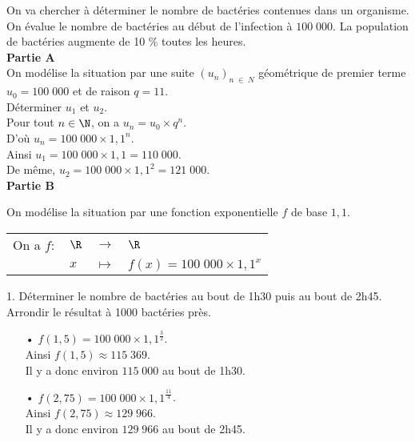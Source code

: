 On va chercher à déterminer le nombre de bactéries contenues dans un organisme. \\
On évalue le nombre de bactéries au début de l'infection à $100\;000$. La population de bactéries augmente de 10 \% toutes les heures. \\

\textbf{Partie A} \\

On modélise la situation par une suite $\left(u_n\right)_{n \; \in \; N}$ géométrique de premier terme $u_0 = 100\;000$ et de raison $q = 11$. \\

Déterminer $u_1$ et $u_2$. \\

Pour tout $n \in \N$, on a $u_n = u_0 \times q^n$. \\
D'où $u_n = 100\; 000 \times 1,1^n$. \\

Ainsi $u_1 = 100\;000 \times 1,1 = 110\;000$.\\
De même, $u_2 = 100\;000 \times 1,1^2 = 121\;000$. \\

\textbf{Partie B}

On modélise la situation par une fonction exponentielle $f$ de base $1,1$. \\

\begin{tabular}{llll}
\hspace*{-.3cm} On a $f:$ & $\R$ & $\longrightarrow$ & $\R$ \\
& $x$ & $\longmapsto$ & $f(x) = 100\;000 \times 1,1^x$ \\
\end{tabular}

\vspace*{.3cm}

1. Déterminer le nombre de bactéries au bout de 1h30 puis au bout de 2h45. Arrondir le résultat à 1000 bactéries près. \\

\begin{itemize}
\item[•] $f(1,5) = 100\;000 \times 1,1^{\frac{3}{2}}$. \\ Ainsi $f(1,5) \approx 115\; 369$. \\ Il y a donc environ $115\;000$ au bout de 1h30. \\
\item[•] $f(2,75) = 100\;000 \times 1,1^{\frac{11}{4}}$. \\ Ainsi $f(2,75) \approx 129\; 966$. \\ Il y a donc environ $129\;966$ au bout de 2h45. \\
\end{itemize}

